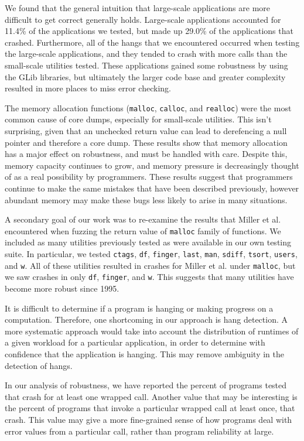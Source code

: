 We found that the general intuition that large-scale applications are more difficult to get correct generally holds. Large-scale applications accounted for 11.4\% of the applications we tested, but made up 29.0\% of the applications that crashed. Furthermore, all of the hangs that we encountered occurred when testing the large-scale applications, and they tended to crash with more calls than the small-scale utilities tested. These applications gained some robustness by using the GLib libraries, but ultimately the larger code base and greater complexity resulted in more places to miss error checking.

The memory allocation functions (\texttt{malloc}, \texttt{calloc}, and \texttt{realloc}) were the most common cause of core dumps, especially for small-scale utilities. This isn't surprising, given that an unchecked return value can lead to derefencing a null pointer and therefore a core dump. These results show that memory allocation has a major effect on robustness, and must be handled with care. Despite this, memory capacity continues to grow, and memory pressure is decreasingly thought of as a real possibility by programmers. These results suggest that programmers continue to make the same mistakes that have been described previously, however abundant memory may make these bugs less likely to arise in many situations.

A secondary goal of our work was to re-examine the results that Miller et al. encountered when fuzzing the return value of \texttt{malloc} family of functions. We included as many utilities previously tested as were available in our own testing suite. In particular, we tested \texttt{ctags}, \texttt{df}, \texttt{finger}, \texttt{last}, \texttt{man}, \texttt{sdiff}, \texttt{tsort}, \texttt{users}, and \texttt{w}. All of these utilities resulted in crashes for Miller et al. under \texttt{malloc}, but we saw crashes in only \texttt{df}, \texttt{finger}, and \texttt{w}. This suggests that many utilities have become more robust since 1995.  

It is difficult to determine if a program is hanging or making progress on a computation. Therefore, one shortcoming in our approach is hang detection. A more systematic approach would take into account the distribution of runtimes of a given workload for a particular application, in order to determine with confidence that the application is hanging. This may remove ambiguity in the detection of hangs.

In our analysis of robustness, we have reported the percent of programs tested that crash for at least one wrapped call. Another value that may be interesting is the percent of programs that invoke a particular wrapped call at least once, that crash. This value may give a more fine-grained sense of how programs deal with error values from a particular call, rather than program reliability at large.